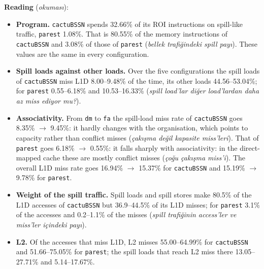\documentclass[10pt,a4paper]{article}
\newcommand{\ct}[1]{\texttt{#1}}
\newcommand{\trgloss}[1]{(\textit{#1})}
\begin{document}
\textbf{Reading} \trgloss{okumas{\i}}:
\begin{itemize}
\setlength{\itemsep}{1pt}\setlength{\topsep}{2pt}
\item \textbf{Program.} \ct{cactuBSSN} spends 32.66\% of its ROI instructions on spill-like traffic, \ct{parest} 1.08\%. That is 80.55\% of the memory instructions of \ct{cactuBSSN} and 3.08\% of those of \ct{parest} (\textit{bellek trafi\u{g}indeki spill pay{\i}}). These values are the same in every configuration.
\item \textbf{Spill loads against other loads.} Over the five configurations the spill loads of \ct{cactuBSSN} miss L1D 8.00--9.48\% of the time, its other loads 44.56--53.04\%; for \ct{parest} 0.55--6.18\% and 10.53--16.33\% (\textit{spill load'lar di\u{g}er load'lardan daha az miss ediyor mu?}).
\item \textbf{Associativity.} From \ct{dm} to \ct{fa} the spill-load miss rate of \ct{cactuBSSN} goes 8.35\% $\to$ 9.45\%: it hardly changes with the organisation, which points to capacity rather than conflict misses (\textit{\c{c}ak{\i}\c{s}ma de\u{g}il kapasite miss'leri}). That of \ct{parest} goes 6.18\% $\to$ 0.55\%: it falls sharply with associativity: in the direct-mapped cache these are mostly conflict misses (\textit{\c{c}o\u{g}u \c{c}ak{\i}\c{s}ma miss'i}). The overall L1D miss rate goes 16.94\% $\to$ 15.37\% for \ct{cactuBSSN} and 15.19\% $\to$ 9.78\% for \ct{parest}.
\item \textbf{Weight of the spill traffic.} Spill loads and spill stores make 80.5\% of the L1D accesses of \ct{cactuBSSN} but 36.9--44.5\% of its L1D misses; for \ct{parest} 3.1\% of the accesses and 0.2--1.1\% of the misses (\textit{spill trafi\u{g}inin access'ler ve miss'ler i\c{c}indeki pay{\i}}).
\item \textbf{L2.} Of the accesses that miss L1D, L2 misses 55.00--64.99\% for \ct{cactuBSSN} and 51.66--75.05\% for \ct{parest}; the spill loads that reach L2 miss there 13.05--27.71\% and 5.14--17.67\%.
\end{itemize}
\end{document}
